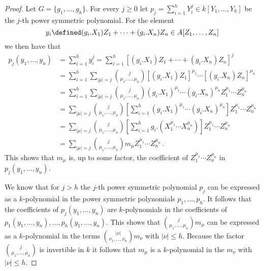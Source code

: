\begin{proof}
  Let $G = \{g_1, \dotsc, g_h\}$.
  For every $j \geq 0$ let $p_j = \sum_{i=1}^h Y_i^j \in k[Y_1, \dotsc, Y_h]$ be the $j$-th power symmetric polynomial.
  For the element
  \[
              y_i
    \defined  (g_i.X_1) Z_1 + \dotsb + (g_i.X_n) Z_n
    \in       A[Z_1, \dotsc, Z_n]
  \]
  we then have that
  \begin{align*}
        p_j(y_1, \dotsc, y_n)
    &=  \sum_{i=1}^h y_i^j
     =  \sum_{i=1}^h \left[ (g_i.X_1) Z_1 + \dotsb + (g_i.X_n) Z_n \right]^j  \\
    &=  \sum_{i=1}^h \sum_{|\mu| = j}
        \binom{j}{\mu_1, \dotsc, \mu_n} [(g_i.X_1) Z_1]^{\mu_1} \dotsm [(g_i.X_n) Z_n]^{\mu_n}  \\
    &=  \sum_{i=1}^h \sum_{|\mu| = j}
        \binom{j}{\mu_1, \dotsc, \mu_n} (g_i.X_1)^{\mu_1} \dotsm (g_i.X_n)^{\mu_n} Z_1^{\mu_1} \dotsm Z_n^{\mu_n} \\
    &=  \sum_{|\mu| = j} \binom{j}{\mu_1, \dotsc, \mu_n}
        \left[
          \sum_{i=1}^h (g_i.X_1)^{\mu_1} \dotsm (g_i.X_n)^{\mu_n}
        \right]
        Z_1^{\mu_1} \dotsm Z_n^{\mu_n}  \\
    &=  \sum_{|\mu| = j} \binom{j}{\mu_1, \dotsc, \mu_n}
        \left[
          \sum_{i=1}^h g_i.(X_1^{\mu_1} \dotsm X_n^{\mu_n})
        \right]
        Z_1^{\mu_1} \dotsm Z_n^{\mu_n}  \\
    &=  \sum_{|\mu| = j} \binom{j}{\mu_1, \dotsc, \mu_n} m_\mu Z_1^{\mu_1} \dotsm Z_n^{\mu_n} \,.
  \end{align*}
  This shows that $m_\mu$ is, up to some factor, the coefficient of $Z_1^{\mu_1} \dotsm Z_n^{\mu_n}$ in $p_j(y_1, \dotsc, y_n)$.
  
  We know that for $j > h$ the $j$-th power symmetric polynomial $p_j$ can be expressed as a $k$-polynomial in the power symmetric polynomials $p_1, \dotsc, p_h$.
  It follows that the coefficients of $p_j(y_1, \dotsc, y_n)$ are $k$-polynomials in the coefficients of $p_1(y_1, \dotsc, y_n), \dotsc, p_h(y_1, \dotsc, y_n)$.
  This shows that $\binom{j}{\mu_1, \dotsc, \mu_n} m_\mu$ can be expressed as a $k$-polynomial in the terms $\binom{|\nu|}{\nu_1, \dotsc, \nu_n} m_\nu$ with $|\nu| \leq h$.
  Because the factor $\binom{j}{\mu_1, \dotsc, \mu_n}$ is invertible in $k$ it follows that $m_\mu$ is a $k$-polynomial in the $m_\nu$ with $|\nu| \leq h$.
\end{proof}


